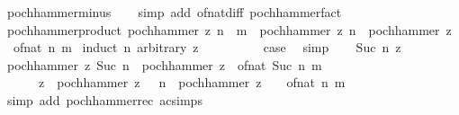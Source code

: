 \begin{isabellebody}
\ pochhammer{\isacharunderscore}{\kern0pt}minus\isanewline
\ \ \isamarkupfalse%
\ {\isacharparenleft}{\kern0pt}simp\ add{\isacharcolon}{\kern0pt}\ of{\isacharunderscore}{\kern0pt}nat{\isacharunderscore}{\kern0pt}diff\ pochhammer{\isacharunderscore}{\kern0pt}fact{\isacharparenright}{\kern0pt}%
\endisatagproof
{\isafoldproof}%
%
\isadelimproof
\isanewline
%
\endisadelimproof
\isanewline
{}\isamarkupfalse%
\ pochhammer{\isacharunderscore}{\kern0pt}product{\isacharprime}{\kern0pt}{\isacharcolon}{\kern0pt}\ {\isachardoublequoteopen}pochhammer\ z\ {\isacharparenleft}{\kern0pt}n\ {\isacharplus}{\kern0pt}\ m{\isacharparenright}{\kern0pt}\ {\isacharequal}{\kern0pt}\ pochhammer\ z\ n\ {\isacharasterisk}{\kern0pt}\ pochhammer\ {\isacharparenleft}{\kern0pt}z\ {\isacharplus}{\kern0pt}\ of{\isacharunderscore}{\kern0pt}nat\ n{\isacharparenright}{\kern0pt}\ m{\isachardoublequoteclose}\isanewline
%
\isadelimproof
%
\endisadelimproof
%
\isatagproof
{}\isamarkupfalse%
\ {\isacharparenleft}{\kern0pt}induct\ n\ arbitrary{\isacharcolon}{\kern0pt}\ z{\isacharparenright}{\kern0pt}\isanewline
\ \ \isamarkupfalse%
\ {}\isanewline
\ \ \isamarkupfalse%
\ \isamarkupfalse%
\ {\isacharquery}{\kern0pt}case\ \isamarkupfalse%
\ simp\isanewline
{}\isamarkupfalse%
\isanewline
\ \ \isamarkupfalse%
\ {\isacharparenleft}{\kern0pt}Suc\ n\ z{\isacharparenright}{\kern0pt}\isanewline
\ \ \isamarkupfalse%
\ {\isachardoublequoteopen}pochhammer\ z\ {\isacharparenleft}{\kern0pt}Suc\ n{\isacharparenright}{\kern0pt}\ {\isacharasterisk}{\kern0pt}\ pochhammer\ {\isacharparenleft}{\kern0pt}z\ {\isacharplus}{\kern0pt}\ of{\isacharunderscore}{\kern0pt}nat\ {\isacharparenleft}{\kern0pt}Suc\ n{\isacharparenright}{\kern0pt}{\isacharparenright}{\kern0pt}\ m\ {\isacharequal}{\kern0pt}\isanewline
\ \ \ \ \ \ z\ {\isacharasterisk}{\kern0pt}\ {\isacharparenleft}{\kern0pt}pochhammer\ {\isacharparenleft}{\kern0pt}z\ {\isacharplus}{\kern0pt}\ {}{\isacharparenright}{\kern0pt}\ n\ {\isacharasterisk}{\kern0pt}\ pochhammer\ {\isacharparenleft}{\kern0pt}z\ {\isacharplus}{\kern0pt}\ {}\ {\isacharplus}{\kern0pt}\ of{\isacharunderscore}{\kern0pt}nat\ n{\isacharparenright}{\kern0pt}\ m{\isacharparenright}{\kern0pt}{\isachardoublequoteclose}\isanewline
\ \ \ \ \isamarkupfalse%
\ {\isacharparenleft}{\kern0pt}simp\ add{\isacharcolon}{\kern0pt}\ pochhammer{\isacharunderscore}{\kern0pt}rec\ ac{\isacharunderscore}{\kern0pt}simps{\isacharparenright}{\kern0pt}\isanewline

\end{isabellebody}
